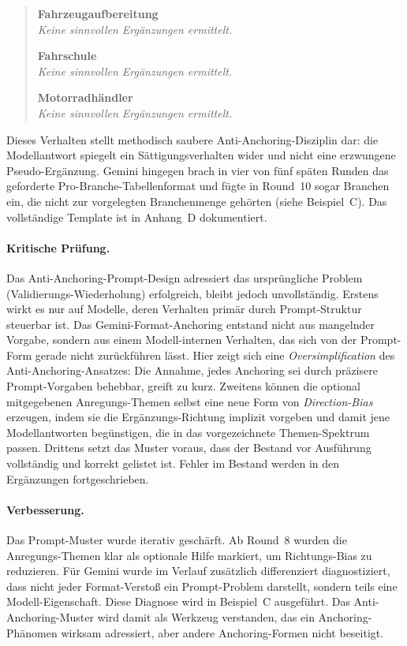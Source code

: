 \documentclass[a4paper,11pt]{article}
\begin{document}
\begin{quote}\small
\textbf{Fahrzeugaufbereitung} \\
\textit{Keine sinnvollen Ergänzungen ermittelt.}

\smallskip
\textbf{Fahrschule} \\
\textit{Keine sinnvollen Ergänzungen ermittelt.}

\smallskip
\textbf{Motorradhändler} \\
\textit{Keine sinnvollen Ergänzungen ermittelt.}
\end{quote}

Dieses Verhalten stellt methodisch saubere Anti-Anchoring-Disziplin
dar: die Modellantwort spiegelt ein Sättigungsverhalten wider und
nicht eine erzwungene Pseudo-Ergänzung. Gemini hingegen brach in vier
von fünf späten Runden das geforderte Pro-Branche-Tabellenformat und
fügte in Round~10 sogar Branchen ein, die nicht zur vorgelegten
Branchenmenge gehörten (siehe Beispiel~C). Das vollständige Template
ist in Anhang~D dokumentiert.

\paragraph{Kritische Prüfung.}
Das Anti-Anchoring-Prompt-Design adressiert das ursprüngliche Problem
(Validierungs-Wiederholung) erfolgreich, bleibt jedoch unvollständig.
Erstens wirkt es nur auf Modelle, deren Verhalten primär durch
Prompt-Struktur steuerbar ist. Das Gemini-Format-Anchoring entstand
nicht aus mangelnder Vorgabe, sondern aus einem Modell-internen
Verhalten, das sich von der Prompt-Form gerade nicht zurückführen
lässt. Hier zeigt sich eine \emph{Oversimplification} des
Anti-Anchoring-Ansatzes: Die Annahme, jedes Anchoring sei durch
präzisere Prompt-Vorgaben behebbar, greift zu kurz. Zweitens können
die optional mitgegebenen Anregungs-Themen selbst eine neue Form von
\emph{Direction-Bias} erzeugen, indem sie die Ergänzungs-Richtung
implizit vorgeben und damit jene Modellantworten begünstigen, die in
das vorgezeichnete Themen-Spektrum passen. Drittens setzt das Muster
voraus, dass der Bestand vor Ausführung vollständig und korrekt
gelistet ist. Fehler im Bestand werden in den Ergänzungen
fortgeschrieben.

\paragraph{Verbesserung.}
Das Prompt-Muster wurde iterativ geschärft. Ab Round~8 wurden die
Anregungs-Themen klar als optionale Hilfe markiert, um Richtungs-Bias
zu reduzieren. Für Gemini wurde im Verlauf zusätzlich differenziert
diagnostiziert, dass nicht jeder Format-Verstoß ein Prompt-Problem
darstellt, sondern teils eine Modell-Eigenschaft. Diese Diagnose wird
in Beispiel~C ausgeführt. Das Anti-Anchoring-Muster wird damit als
Werkzeug verstanden, das ein Anchoring-Phänomen wirksam adressiert,
aber andere Anchoring-Formen nicht beseitigt.
\end{document}
